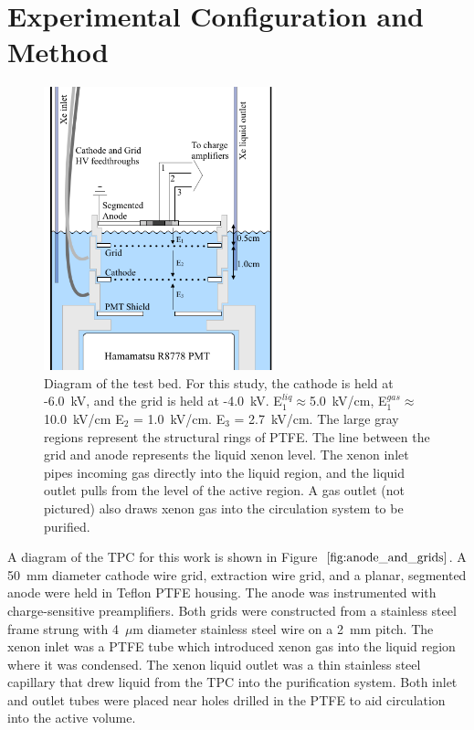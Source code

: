 \section{Experimental Configuration and Method}
\begin{figure}[ht]
    \centering
    \includegraphics[width=0.6\textwidth]{figures/radon/internals.png}
    \caption{Diagram of the test bed. For this study, the cathode is held at -6.0~kV, and the grid is held at -4.0~kV. E$_{1}^{liq} \approx $5.0~kV/cm, E$_{1}^{gas} \approx $10.0~kV/cm E$_{2}$ = 1.0~kV/cm. E$_{3}$ = 2.7~kV/cm. The large gray regions represent the structural rings of \acs{PTFE}. The line between the grid and anode represents the liquid xenon level. The xenon inlet pipes incoming gas directly into the liquid region, and the liquid outlet pulls from the level of the active region. A gas outlet (not pictured) also draws xenon gas into the circulation system to be purified.}
    \label{fig:anode_and_grids}
\end{figure}

A diagram of the \ac{TPC} for this work is shown in Figure~$\ref{fig:anode_and_grids}$. A 50~mm diameter cathode wire grid, extraction wire grid, and a planar, segmented anode were held in Teflon \ac{PTFE} housing. The anode was instrumented with charge-sensitive preamplifiers. Both grids were constructed from a stainless steel frame strung with 4~$\mu$m diameter stainless steel wire on a 2~mm pitch. The xenon inlet was a \ac{PTFE} tube which introduced xenon gas into the liquid region where it was condensed. The xenon liquid outlet was a thin stainless steel capillary that drew liquid from the \ac{TPC} into the purification system. Both inlet and outlet tubes were placed near holes drilled in the \ac{PTFE} to aid circulation into the active volume.

